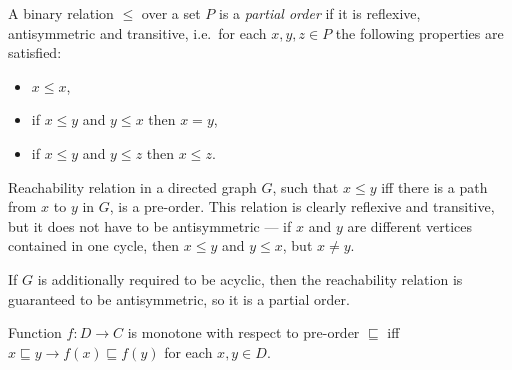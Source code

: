 \begin{defn}
A binary relation $\le$ over a set $P$ is a \emph{partial order} if it is reflexive, antisymmetric and transitive, i.e.\ for each $x, y, z \in P$ the following properties are satisfied:
\begin{itemize}
\item $x \le x$,
\item if $x \le y$ and $y \le x$ then $x = y$,
\item if $x \le y$ and $y \le z$ then $x \le z$.
\end{itemize}
\end{defn}

\begin{exmp}
Reachability relation in a directed graph $G$, such that $x \le y$ iff there is a path from $x$ to $y$ in $G$, is a pre-order. This relation is clearly reflexive and transitive, but it does not have to be antisymmetric --- if $x$ and $y$ are different vertices contained in one cycle, then $x \le y$ and $y \le x$, but $x \ne y$.

If $G$ is additionally required to be acyclic, then the reachability relation is guaranteed to be antisymmetric, so it is a partial order.
\end{exmp}


\begin{defn}[Monotonicity]
Function $f: D \to C$ is monotone with respect to pre-order $\sqsubseteq$ iff $x \sqsubseteq y \rightarrow f(x) \sqsubseteq f(y)$ for each $x, y \in D$.
\end{defn}
